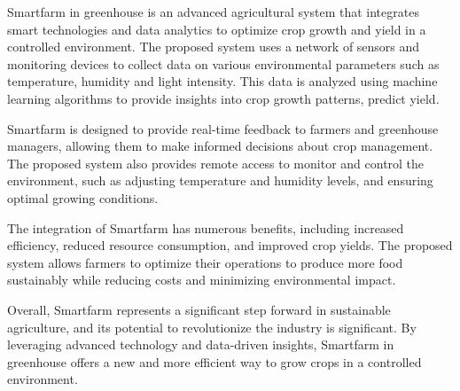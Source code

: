 \begin{abstractEn}
	
	Smartfarm in greenhouse is an advanced agricultural system that integrates smart technologies and data analytics to optimize crop growth and yield in a controlled environment. The proposed system uses a network of sensors and monitoring devices to collect data on various environmental parameters such as temperature, humidity and light intensity. This data is analyzed using machine learning algorithms to provide insights into crop growth patterns, predict yield.

	Smartfarm  is designed to provide real-time feedback to farmers and greenhouse managers, allowing them to make informed decisions about crop management. The proposed system also provides remote access to monitor and control the environment, such as adjusting temperature and humidity levels, and ensuring optimal growing conditions.
	
	The integration of Smartfarm  has numerous benefits, including increased efficiency, reduced resource consumption, and improved crop yields. The proposed system allows farmers to optimize their operations to produce more food sustainably while reducing costs and minimizing environmental impact.
	
	Overall, Smartfarm  represents a significant step forward in sustainable agriculture, and its potential to revolutionize the industry is significant. By leveraging advanced technology and data-driven insights, Smartfarm in greenhouse offers a new and more efficient way to grow crops in a controlled environment.
	
\end{abstractEn}

